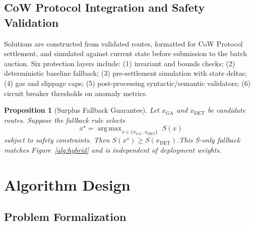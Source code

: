 \documentclass[11pt]{article}
\newtheorem{proposition}{Proposition}
\DeclareMathOperator*{\argmax}{arg\,max}
\newcommand{\1}{\mathbf{1}}  %
\begin{document}
\subsection{CoW Protocol Integration and Safety Validation}
Solutions are constructed from validated routes, formatted for CoW Protocol settlement, and simulated against current state before submission to the batch auction. Six protection layers include: (1) invariant and bounds checks; (2) deterministic baseline fallback; (3) pre-settlement simulation with state deltas; (4) gas and slippage caps; (5) post-processing syntactic/semantic validators; (6) circuit breaker thresholds on anomaly metrics.
\begin{proposition}[Surplus Fallback Guarantee]\label{prop:fallback}
Let $x_{\text{GA}}$ and $x_{\text{DET}}$ be candidate routes. Suppose the fallback rule selects
\[
 x^{\star} = \argmax_{x\in\{x_{\text{GA}},\,x_{\text{DET}}\}} \; S(x)
\]
subject to safety constraints. Then $S(x^{\star}) \ge S(x_{\text{DET}})$.\;\textnormal{This S-only fallback matches Figure~\ref{alg:hybrid} and is independent of deployment weights.}
\end{proposition}

\section{Algorithm Design}
\label{sec:algorithm}
\subsection{Problem Formalization}
\end{document}
